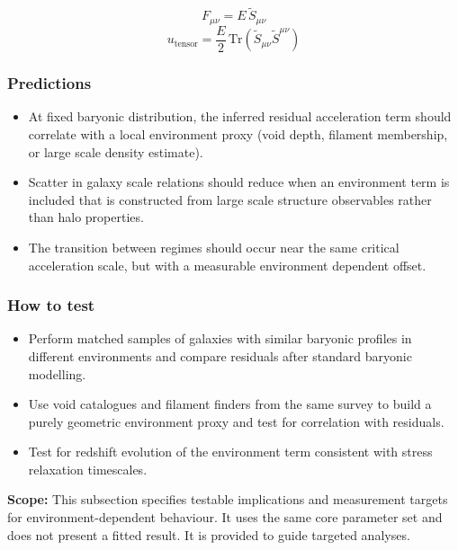 \documentclass[11pt,a4paper]{article}
\begin{document}
$$
F_{\mu\nu} = E\,\tilde{S}_{\mu\nu}
$$
$$
u_{\mathrm{tensor}} = \frac{E}{2}\,\mathrm{Tr}\!\left(\tilde{S}_{\mu\nu}\tilde{S}^{\mu\nu}\right)
$$

\subsubsection{Predictions}
\begin{itemize}
  \item At fixed baryonic distribution, the inferred residual acceleration term should correlate with a local environment proxy (void depth, filament membership, or large scale density estimate).
  \item Scatter in galaxy scale relations should reduce when an environment term is included that is constructed from large scale structure observables rather than halo properties.
  \item The transition between regimes should occur near the same critical acceleration scale, but with a measurable environment dependent offset.
\end{itemize}

\subsubsection{How to test}
\begin{itemize}
  \item Perform matched samples of galaxies with similar baryonic profiles in different environments and compare residuals after standard baryonic modelling.
  \item Use void catalogues and filament finders from the same survey to build a purely geometric environment proxy and test for correlation with residuals.
  \item Test for redshift evolution of the environment term consistent with stress relaxation timescales.
\end{itemize}

\begin{mdframed}[linecolor=accent,linewidth=0.5pt,backgroundcolor=callout-bg,leftline=true,rightline=true,topline=true,bottomline=true,innerleftmargin=8pt,innerrightmargin=8pt,innertopmargin=6pt,innerbottommargin=6pt]
\textbf{Scope:} This subsection specifies testable implications and measurement targets for environment-dependent behaviour. It uses the same core parameter set and does not present a fitted result. It is provided to guide targeted analyses.
\end{mdframed}
\end{document}

